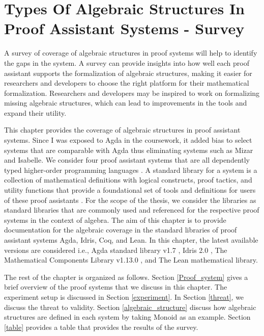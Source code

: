 \chapter{Types Of Algebraic Structures In Proof Assistant Systems - Survey}

A survey of coverage of algebraic structures in proof systems will help to
identify the gaps in the system. A survey can provide insights into how well
each proof assistant supports the formalization of algebraic structures, making
it easier for researchers and developers to choose the right platform for their
mathematical formalization. Researchers and developers may be inspired to work
on formalizing missing algebraic structures, which can lead to improvements in
the tools and expand their utility.

This chapter provides the coverage of algebraic structures in proof assistant
systems. Since I was exposed to Agda in the coursework, it added bias to select
systems that are comparable with Agda thus eliminating systems such as Mizar
and Isabelle. We consider four proof assistant systems that are all dependently
typed higher-order programming languages \cite{2019arXiv191203028S}. A standard
library for a system is a collection of mathematical definitions with logical
constructs, proof tactics, and utility functions that provide a foundational set
of tools and definitions for users of these proof assistants
\cite{kohlhase2021experiences}. For the scope of the thesis, we consider the
libraries as standard libraries that are commonly used and referenced for the
respective proof systems in the context of algebra. The aim of this chapter is
to provide documentation for the algebraic coverage in the standard libraries of
proof assistant systems Agda, Idris, Coq, and Lean. In this chapter, the latest
available versions are considered i.e., Agda standard library v1.7
\cite{AgdaStandardLibrary}, Idris 2.0 \cite{Brady2021Idris2Q}, The Mathematical
Components Library v1.13.0 \cite{assia_mahboubi_2021_4457887}, and The Lean
mathematical library\cite{10.1145/3372885.3373824}.

The rest of the chapter is organized as follows. Section \ref{Proof_system}
gives a brief overview of the proof systems that we discuss in this chapter.
The experiment setup is discussed in Section \ref{experiment}. In Section
\ref{threat}, we discuss the threat to validity. Section \ref{algebraic_structure}
discuss how algebraic structures are defined in each system by taking Monoid as
an example. Section \ref{table} provides a table that provides the results of the
survey.

